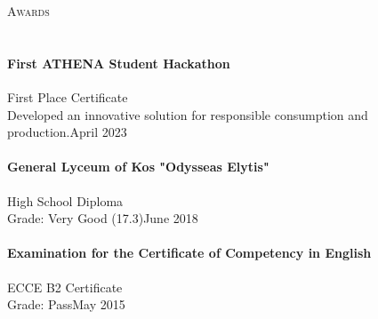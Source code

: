 \documentclass[a4paper, 11pt]{article}
\newcommand{\lineunder} {
	\vspace*{-8pt} \\
	\hspace*{-18pt} \hrulefill \\
}
\newcommand{\header} [1] {
	\vspace*{6mm}
	{\hspace*{-18pt}\vspace*{6pt} \textsc{#1}}
	\vspace*{-6pt} \lineunder
}
\newcommand{\award}[4]{%
	\paragraph{#1} \hfill #2 \\
	#3\hfill #4\\
}
\begin{document}
\header{Awards}
\award
{First ATHENA Student Hackathon}
{First Place Certificate}
{Developed an innovative solution for responsible consumption and production.}
{April 2023}
\award
{General Lyceum of Kos "Odysseas Elytis"}
{High School Diploma}
{Grade: Very Good (17.3)}
{June 2018}
\award
{Examination for the Certificate of Competency in English}
{ECCE B2 Certificate}
{Grade: Pass}
{May 2015}
\end{document}
